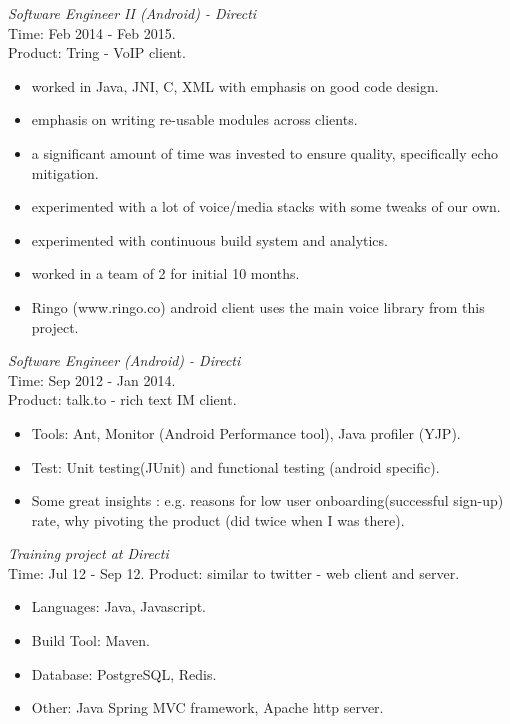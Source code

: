 \documentclass[margin,line]{resume}
\begin{document}
\begin{resume}
\textit{Software Engineer II (Android) - Directi} \\
Time: Feb 2014 - Feb 2015.\\
Product: Tring - VoIP client.\\
\begin{itemize}
	\item worked in Java, JNI, C, XML with emphasis on good code design.
	\item emphasis on writing re-usable modules across clients.
	\item a significant amount of time was invested to ensure quality, specifically echo mitigation.
	\item experimented with a lot of voice/media stacks with some tweaks of our own.
	\item experimented with continuous build system and analytics.
        \item worked in a team of 2 for initial 10 months.
        \item Ringo (www.ringo.co) android client uses the main voice library from this project.
 \end{itemize}

\textit{Software Engineer (Android) - Directi} \\
Time: Sep 2012 - Jan 2014.\\
Product: talk.to - rich text IM client.\\
\begin{itemize}
\item Tools: Ant, Monitor (Android Performance tool), Java profiler (YJP).
\item Test: Unit testing(JUnit) and functional testing (android specific).
\item Some great insights : e.g. reasons for low user onboarding(successful sign-up) rate, why pivoting the product (did twice when I was there).
\end{itemize}

\textit{Training project at Directi}\\
Time: Jul 12 - Sep 12.
Product: similar to twitter - web client and server.\\
 \begin{itemize}
\item Languages: Java, Javascript.
\item Build Tool: Maven.
\item Database: PostgreSQL, Redis.
\item Other: Java Spring MVC framework, Apache http server.  
 \end{itemize}


\end{resume}
\end{document}
